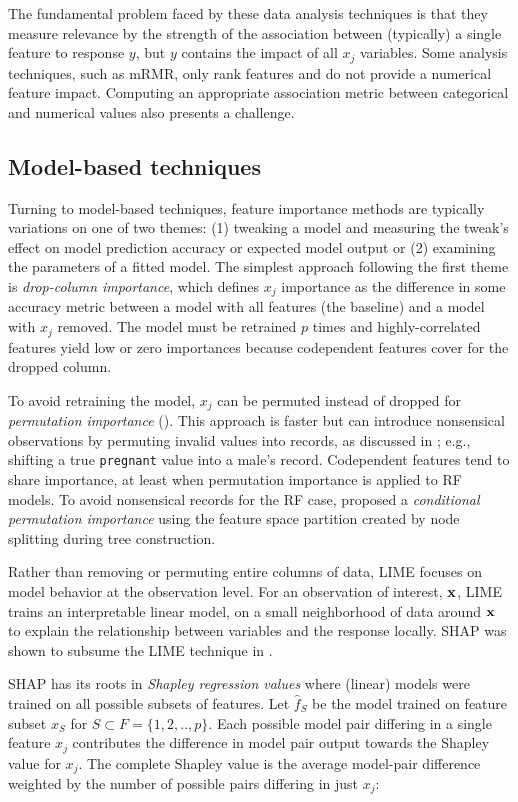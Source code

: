 \documentclass[smallextended]{svjour3}       %
\begin{document}
The fundamental problem faced by these data analysis techniques is that they measure relevance by the strength of the association between (typically) a single feature to response $y$, but $y$ contains the impact of all $x_j$ variables. Some analysis techniques, such as mRMR, only rank features and do not provide a numerical feature impact. Computing an appropriate association metric between categorical and numerical values also presents a challenge.

\subsection{Model-based techniques}

Turning to model-based techniques, feature importance methods are typically variations on one of two themes:  (1) tweaking a model and measuring the tweak's effect on model prediction accuracy or expected model output or (2) examining the parameters of a fitted model. The simplest approach following the first theme is {\em drop-column importance}, which defines $x_j$ importance as the difference in some accuracy metric between a model with all features (the baseline) and a model with $x_j$ removed. The model must be retrained $p$ times and highly-correlated features yield low or zero importances because codependent features cover for the dropped column.

To avoid retraining the model, $x_j$ can be permuted instead of dropped for {\em permutation importance} (\citealt{RF}). This approach is faster but can introduce nonsensical observations by permuting invalid values into records, as discussed in \cite{stopperm}; e.g., shifting a true {\tt\small pregnant} value into a male's record. Codependent features tend to share importance, at least when permutation importance is applied to RF models. To avoid nonsensical records for the RF case, \cite{rfimp} proposed a {\em conditional permutation importance} using the feature space partition created by node splitting during tree construction.  

Rather than removing or permuting entire columns of data, LIME \citep{lime} focuses on model behavior at the observation level. For an observation of interest, $\bf x$, LIME trains an interpretable linear model, on a small neighborhood of data around $\bf x$ to explain the relationship between variables and the response locally. SHAP was shown to subsume the LIME technique in \cite{shap}. 

SHAP has its roots in {\em Shapley regression values} \citep{shapley-regression} where (linear) models were trained on all possible subsets of features. Let $\hat{f}_S$ be the model trained on feature subset $x_S$ for $S \subset F = \{1, 2, .., p\}$. Each possible model pair differing in a single feature $x_j$ contributes the difference in model pair output towards the Shapley value for $x_j$. The complete Shapley value is the average model-pair difference weighted by the number of possible pairs differing in just $x_j$:
\vspace{-1mm}
\end{document}
